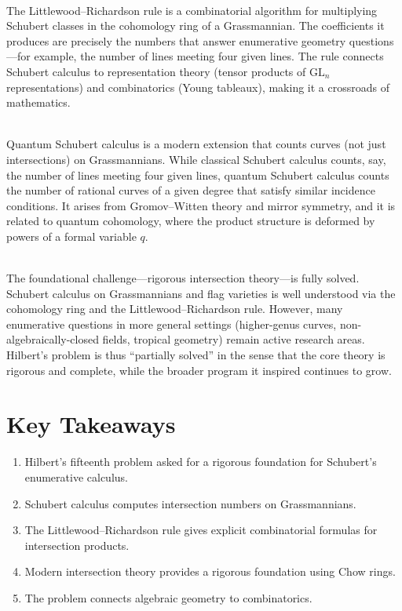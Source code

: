 \begin{description}[font=\bfseries, leftmargin=2em, style=nextline]
\item[Q: How does the Littlewood--Richardson rule fit in?]\hfill\\
The Littlewood--Richardson rule is a combinatorial algorithm for multiplying Schubert classes in the cohomology ring of a Grassmannian. The coefficients it produces are precisely the numbers that answer enumerative geometry questions---for example, the number of lines meeting four given lines. The rule connects Schubert calculus to representation theory (tensor products of $\mathrm{GL}_n$ representations) and combinatorics (Young tableaux), making it a crossroads of mathematics.

\item[Q: What is quantum Schubert calculus?]\hfill\\
Quantum Schubert calculus is a modern extension that counts curves (not just intersections) on Grassmannians. While classical Schubert calculus counts, say, the number of lines meeting four given lines, quantum Schubert calculus counts the number of rational curves of a given degree that satisfy similar incidence conditions. It arises from Gromov--Witten theory and mirror symmetry, and it is related to quantum cohomology, where the product structure is deformed by powers of a formal variable $q$.

\item[Q: What is Problem~15's status today?]\hfill\\
The foundational challenge---rigorous intersection theory---is fully solved. Schubert calculus on Grassmannians and flag varieties is well understood via the cohomology ring and the Littlewood--Richardson rule. However, many enumerative questions in more general settings (higher-genus curves, non-algebraically-closed fields, tropical geometry) remain active research areas. Hilbert's problem is thus ``partially solved'' in the sense that the core theory is rigorous and complete, while the broader program it inspired continues to grow.

\end{description}

\section*{Key Takeaways}

\begin{enumerate}
    \item Hilbert's fifteenth problem asked for a rigorous foundation for Schubert's enumerative calculus.
    \item Schubert calculus computes intersection numbers on Grassmannians.
    \item The Littlewood--Richardson rule gives explicit combinatorial formulas for intersection products.
    \item Modern intersection theory provides a rigorous foundation using Chow rings.
    \item The problem connects algebraic geometry to combinatorics.
\end{enumerate}

